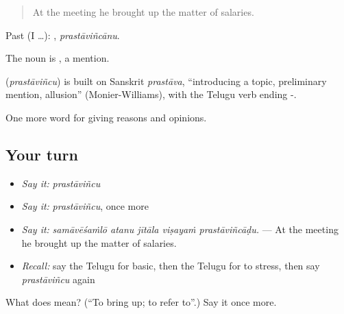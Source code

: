 \begin{quote}
At the meeting he brought up the matter of salaries.
\end{quote}

Past (I …): , \emph{prastāviñcānu}.

The noun is , a mention.

\begin{cousinweb}
\textbf{} (\emph{prastāviñcu}) is built on Sanskrit \emph{prastāva}, \textquotedblleft{}introducing a topic, preliminary mention, allusion\textquotedblright{} (Monier-Williams), with the Telugu verb ending -.
\end{cousinweb}

\begin{grammarlens}[title={What you've built}]
One more word for giving reasons and opinions.
\end{grammarlens}

\subsection*{Your turn}
\begin{itemize}
\raggedright
  \item \emph{Say it:} \emph{prastāviñcu}
  \item \emph{Say it:} \emph{prastāviñcu}, once more
  \item \emph{Say it:} \emph{samāvēśaṁlō atanu jītāla viṣayaṁ prastāviñcāḍu.} — At the meeting he brought up the matter of salaries.
  \item \emph{Recall:} say the Telugu for basic, then the Telugu for to stress, then say \emph{prastāviñcu} again
\end{itemize}

\begin{tcolorbox}[breakable,colback=teal!4,colframe=teal!35!black,title={Before you move on}]
What does  mean? (\textquotedblleft{}To bring up; to refer to\textquotedblright{}.) Say it once more.
\end{tcolorbox}
